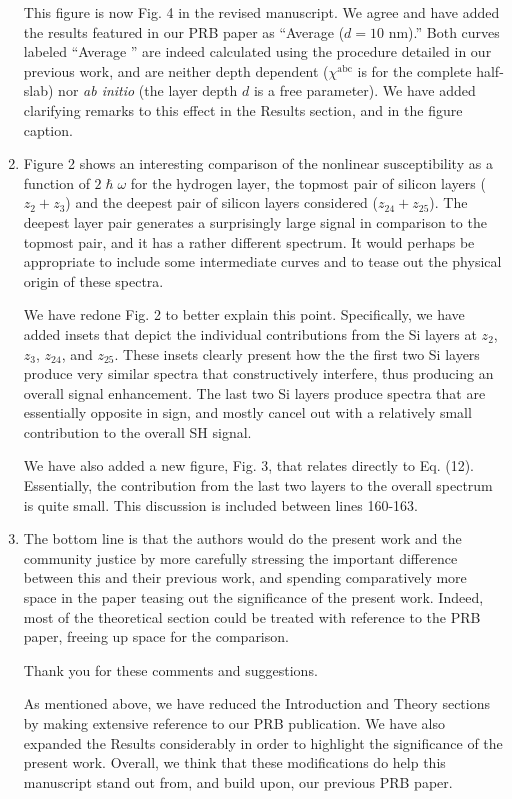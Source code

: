 \documentclass{article}
\begin{document}
\begin{enumerate}[label=\alph*.]
\begin{shaded}
This figure is now Fig. 4 in the revised manuscript. We agree and have added the results featured in our PRB paper as ``Average ($d = 10$ nm).'' Both curves labeled ``Average '' are indeed calculated using the procedure detailed in our previous work, and are neither depth dependent ($\chi^{\mathrm{abc}}$ is for the complete half-slab) nor \emph{ab initio} (the layer depth $d$ is a free parameter). We have added clarifying remarks to this effect in the Results section, and in the figure caption.
\end{shaded}

\item Figure 2 shows an interesting comparison of the nonlinear
susceptibility as a function of $2\hslash \omega$ for the hydrogen layer,
the topmost pair of silicon layers ($z_{2}+z_{3}$) and the deepest pair of
silicon layers considered ($z_{24}+z_{25}$). The deepest layer pair
generates a surprisingly large signal in comparison to the topmost pair,
and it has a rather different spectrum. It would perhaps be appropriate to
include some intermediate curves and to tease out the physical origin of
these spectra.

\begin{shaded}
We have redone Fig. 2 to better explain this point. Specifically, we have added insets that depict the individual contributions from the Si layers at $z_{2}$, $z_{3}$, $z_{24}$, and $z_{25}$. These insets clearly present how the the first two Si layers produce very similar spectra that constructively interfere, thus producing an overall signal enhancement. The last two Si layers produce spectra that are essentially opposite in sign, and mostly cancel out with a relatively small contribution to the overall SH signal.

We have also added a new figure, Fig. 3, that relates directly to Eq. (12). Essentially, the contribution from the last two layers to the overall spectrum is quite small. This discussion is included between lines 160-163.
\end{shaded}

\item The bottom line is that the authors would do the present work and the
community justice by more carefully stressing the important difference
between this and their previous work, and spending comparatively more
space in the paper teasing out the significance of the present
work. Indeed, most of the theoretical section could be treated with
reference to the PRB paper, freeing up space for the comparison.

\begin{shaded}
Thank you for these comments and suggestions.

As mentioned above, we have reduced the Introduction and Theory sections by making extensive reference to our PRB publication. We have also expanded the Results considerably in order to highlight the significance of the present work. Overall, we think that these modifications do help this manuscript stand out from, and build upon, our previous PRB paper. 
\end{shaded}

\end{enumerate}
\end{document}
